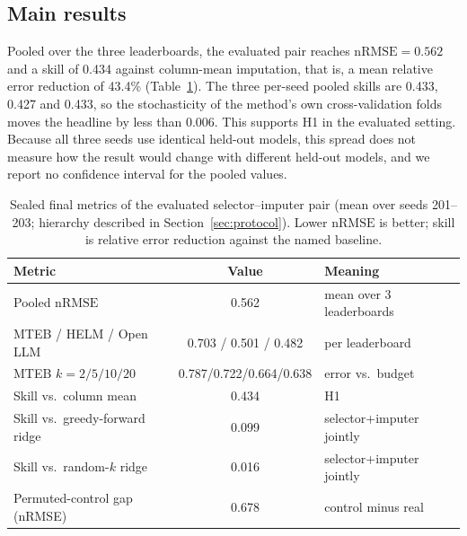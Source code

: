 \documentclass{article}
\newcommand{\nrmse}{\mathrm{nRMSE}}
\begin{document}
\subsection{Main results}
Pooled over the three leaderboards, the evaluated pair reaches $\nrmse=0.562$ and a skill of 0.434 against column-mean imputation, that is, a mean relative error reduction of 43.4\% (Table~\ref{tab:final}). %
The three per-seed pooled skills are 0.433, 0.427 and 0.433, so the stochasticity of the method's own cross-validation folds moves the headline by less than 0.006. %
This supports H1 in the evaluated setting. Because all three seeds use identical held-out models, this spread does not measure how the result would change with different held-out models, and we report no confidence interval for the pooled values.

\begin{table}[t]
\centering
\caption{Sealed final metrics of the evaluated selector--imputer pair (mean over seeds 201--203; hierarchy described in Section~\ref{sec:protocol}). Lower $\nrmse$ is better; skill is relative error reduction against the named baseline.}
\label{tab:final}
\small
\begin{tabular}{lcl}
\toprule
Metric & Value & Meaning\\
\midrule
Pooled $\nrmse$ & 0.562 & mean over 3 leaderboards\\
\quad MTEB / HELM / Open LLM & 0.703 / 0.501 / 0.482 & per leaderboard\\
\quad MTEB $k{=}2/5/10/20$ & 0.787/0.722/0.664/0.638 & error vs.\ budget\\
Skill vs.\ column mean & 0.434 & H1\\
Skill vs.\ greedy-forward ridge & 0.099 & selector+imputer jointly\\
Skill vs.\ random-$k$ ridge & 0.016 & selector+imputer jointly\\
Permuted-control gap (nRMSE) & 0.678 & control minus real\\
\bottomrule
\end{tabular}
\end{table}
\end{document}

